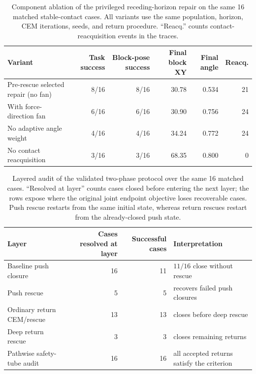 \documentclass{article}
\begin{document}
\begin{table}[H]
\centering
\scriptsize
\setlength{\tabcolsep}{4pt}
\caption{Component ablation of the privileged receding-horizon repair on the
same 16 matched stable-contact cases.  All variants use the same population,
horizon, CEM iterations, seeds, and return procedure.  ``Reacq.'' counts
contact-reacquisition events in the traces.}
\label{tab:supp-receding-ablation}
\begin{tabular}{lrrrrr}
\toprule
Variant & Task success & Block-pose success & Final block XY & Final angle & Reacq. \\
\midrule
Pre-rescue selected repair (no fan) & 8/16 & 8/16 & 30.78 & 0.534 & 21 \\
With force-direction fan & 6/16 & 6/16 & 30.90 & 0.756 & 24 \\
No adaptive angle weight & 4/16 & 4/16 & 34.24 & 0.772 & 24 \\
No contact reacquisition & 3/16 & 3/16 & 68.35 & 0.800 & 0 \\
\bottomrule
\end{tabular}
\end{table}

\begin{table}[H]
\centering
\scriptsize
\setlength{\tabcolsep}{4pt}
\caption{Layered audit of the validated two-phase protocol over the same 16
matched cases.  ``Resolved at layer'' counts cases closed before entering the
next layer; the rows expose where the original joint endpoint objective loses
recoverable cases.  Push rescue restarts from the same initial state, whereas
return rescues restart from the already-closed push state.}
\label{tab:supp-rescue-layer-audit}
\begin{tabular}{lrrl}
\toprule
Layer & Cases resolved at layer & Successful cases & Interpretation \\
\midrule
Baseline push closure & 16 & 11 & $11/16$ close without rescue \\
Push rescue & 5 & 5 & recovers failed push closures \\
Ordinary return CEM/rescue & 13 & 13 & closes before deep rescue \\
Deep return rescue & 3 & 3 & closes remaining returns \\
Pathwise safety-tube audit & 16 & 16 & all accepted returns satisfy the criterion \\
\bottomrule
\end{tabular}
\end{table}
\end{document}
